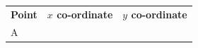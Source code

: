 {\begin{center}
      \label{m39358*id70670}
      
    \noindent
      \tablelasttail{}
      \begin{xtabular*}{\mytablewidth}[t]{|p{10\mystarwidth}|p{10\mystarwidth}|p{10\mystarwidth}|}\hline
    
    
        
                  \textbf{Point}
                 &
    
    
        
                  \textbf{$x$ co-ordinate}
                 &
    
    
        
                  \textbf{$y$ co-ordinate}
     \tabularnewline{}
    
    
        A &
    
    
         &
    
    
     \tabularnewline{}
    

\end{xtabular*}
\end{center}}
